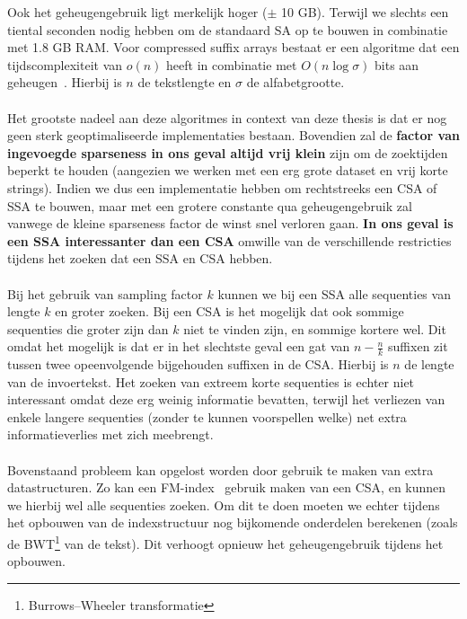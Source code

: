 Ook het geheugengebruik ligt merkelijk hoger ($\pm$ 10 GB).
Terwijl we slechts een tiental seconden nodig hebben om de standaard SA op te bouwen in combinatie met 1.8 GB RAM\@.
Voor compressed suffix arrays bestaat er een algoritme dat een tijdscomplexiteit van $o(n)$ heeft in combinatie met $O(n \log \sigma)$ bits aan geheugen~\cite{building_compressed_sa}.
Hierbij is $n$ de tekstlengte en $\sigma$ de alfabetgrootte.
\\ \\
Het grootste nadeel aan deze algoritmes in context van deze thesis is dat er nog geen sterk geoptimaliseerde implementaties bestaan.
Bovendien zal de \textbf{factor van ingevoegde sparseness in ons geval altijd vrij klein} zijn om de zoektijden beperkt te houden (aangezien we werken met een erg grote dataset en vrij korte strings).
Indien we dus een implementatie hebben om rechtstreeks een CSA of SSA te bouwen, maar met een grotere constante qua geheugengebruik zal vanwege de kleine sparseness factor de winst snel verloren gaan.
\textbf{In ons geval is een SSA interessanter dan een CSA} omwille van de verschillende restricties tijdens het zoeken dat een SSA en CSA hebben.
\\ \\
Bij het gebruik van sampling factor $k$ kunnen we bij een SSA alle sequenties van lengte $k$ en groter zoeken.
Bij een CSA is het mogelijk dat ook sommige sequenties die groter zijn dan $k$ niet te vinden zijn, en sommige kortere wel.
Dit omdat het mogelijk is dat er in het slechtste geval een gat van $n - \frac{n}{k}$ suffixen zit tussen twee opeenvolgende bijgehouden suffixen in de CSA\@.
Hierbij is $n$ de lengte van de invoertekst.
Het zoeken van extreem korte sequenties is echter niet interessant omdat deze erg weinig informatie bevatten, terwijl het verliezen van enkele langere sequenties (zonder te kunnen voorspellen welke) net extra informatieverlies met zich meebrengt.
\\ \\
Bovenstaand probleem kan opgelost worden door gebruik te maken van extra datastructuren.
Zo kan een FM-index~\cite{fm_index} gebruik maken van een CSA, en kunnen we hierbij wel alle sequenties zoeken.
Om dit te doen moeten we echter tijdens het opbouwen van de indexstructuur nog bijkomende onderdelen berekenen (zoals de BWT\footnote{Burrows–Wheeler transformatie} van de tekst).
Dit verhoogt opnieuw het geheugengebruik tijdens het opbouwen.

